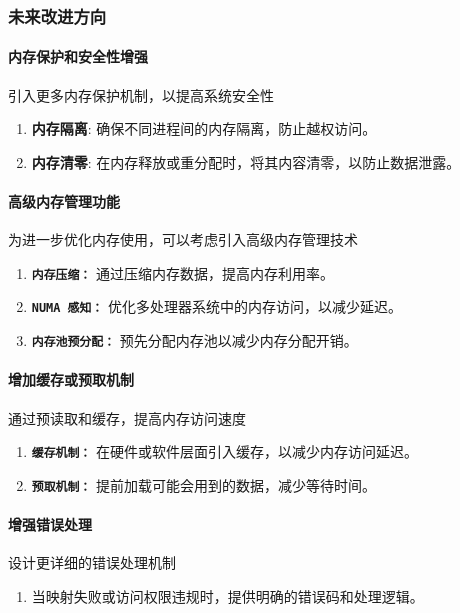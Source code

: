\documentclass[UTF8]{article}
\begin{document}
\subsubsection{未来改进方向}
\paragraph{内存保护和安全性增强}
引入更多内存保护机制，以提高系统安全性
\begin{enumerate}[label=\textbf{\arabic*}., wide, labelwidth=!, labelindent=0pt]
  \item \textbf{内存隔离}: 确保不同进程间的内存隔离，防止越权访问。
  \item \textbf{内存清零}: 在内存释放或重分配时，将其内容清零，以防止数据泄露。
\end{enumerate}

\paragraph{高级内存管理功能}
为进一步优化内存使用，可以考虑引入高级内存管理技术
\begin{enumerate}[label=\textbf{\arabic*}., wide, labelwidth=!, labelindent=0pt]
  \item \textbf{\texttt{内存压缩：}} 通过压缩内存数据，提高内存利用率。
  \item \textbf{\texttt{NUMA 感知：}} 优化多处理器系统中的内存访问，以减少延迟。
  \item \textbf{\texttt{内存池预分配：}} 预先分配内存池以减少内存分配开销。
\end{enumerate}

\paragraph{增加缓存或预取机制}
通过预读取和缓存，提高内存访问速度
\begin{enumerate}[label=\textbf{\arabic*}., wide, labelwidth=!, labelindent=0pt]
  \item \textbf{\texttt{缓存机制：}} 在硬件或软件层面引入缓存，以减少内存访问延迟。
  \item \textbf{\texttt{预取机制：}} 提前加载可能会用到的数据，减少等待时间。
\end{enumerate}

\paragraph{增强错误处理}
设计更详细的错误处理机制
\begin{enumerate}[label=\textbf{\arabic*}., wide, labelwidth=!, labelindent=0pt]
  \item 当映射失败或访问权限违规时，提供明确的错误码和处理逻辑。
\end{enumerate}
\end{document}
